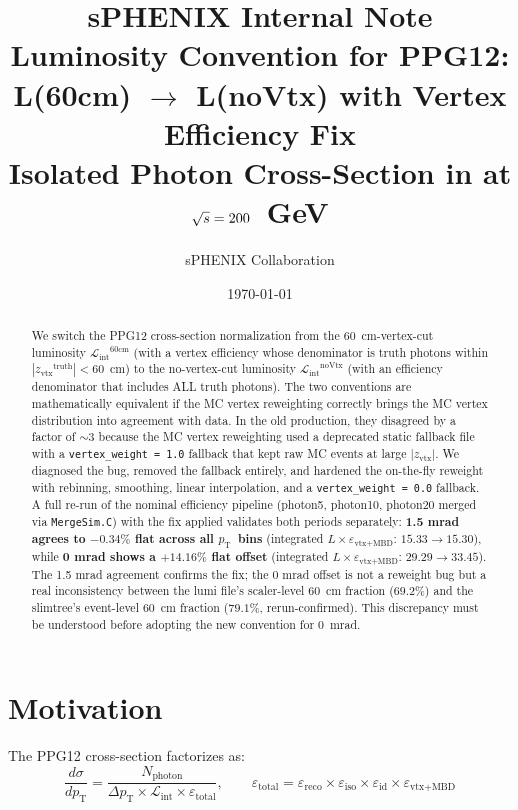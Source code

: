 \documentclass[11pt,letterpaper]{article}
\title{%
  \vspace{-1cm}
  {\large \textbf{sPHENIX Internal Note}}\\[0.5cm]
  {\LARGE \textbf{Luminosity Convention for PPG12:\\
  L(60cm) $\rightarrow$ L(noVtx) with Vertex Efficiency Fix}}\\[0.3cm]
  {\large Isolated Photon Cross-Section in \pp{} at $\mbox{$\sqrt{s}$} = 200$~GeV}
}
\author{sPHENIX Collaboration}
\date{\today}
\newcommand{\pT}{\ensuremath{p_{\text{T}}}}
\newcommand{\zvtx}{\ensuremath{z_{\mathrm{vtx}}}}
\newcommand{\Lint}{\ensuremath{\mathcal{L}_{\text{int}}}}
\newcommand{\veff}{\ensuremath{\varepsilon_{\text{vtx+MBD}}}}
\begin{document}
\maketitle

\begin{abstract}
We switch the PPG12 cross-section normalization from the
60~cm-vertex-cut luminosity $\Lint^{60\text{cm}}$ (with a vertex
efficiency whose denominator is truth photons within
$|\zvtx^{\text{truth}}|<60$~cm) to the no-vertex-cut luminosity
$\Lint^{\text{noVtx}}$ (with an efficiency denominator that includes
ALL truth photons). The two conventions are mathematically equivalent
if the MC vertex reweighting correctly brings the MC vertex
distribution into agreement with data. In the old production, they
disagreed by a factor of $\sim 3$ because the MC vertex reweighting
used a deprecated static fallback file with a
\texttt{vertex\_weight = 1.0} fallback that kept raw MC events at
large $|\zvtx|$. We diagnosed the bug, removed the fallback entirely,
and hardened the on-the-fly reweight with rebinning, smoothing,
linear interpolation, and a \texttt{vertex\_weight = 0.0} fallback.
A full re-run of the nominal efficiency pipeline (photon5, photon10,
photon20 merged via \texttt{MergeSim.C}) with the fix applied
validates both periods separately: \textbf{1.5 mrad agrees to
$-0.34\%$ flat across all \pT\ bins} (integrated $L\times\veff$:
$15.33 \rightarrow 15.30$), while \textbf{0 mrad shows a $+14.16\%$
flat offset} (integrated $L\times\veff$: $29.29 \rightarrow 33.45$).
The 1.5 mrad agreement confirms the fix; the 0 mrad offset is not a
reweight bug but a real inconsistency between the lumi file's
scaler-level 60~cm fraction ($69.2\%$) and the slimtree's event-level
60~cm fraction ($79.1\%$, rerun-confirmed). This discrepancy must be
understood before adopting the new convention for 0~mrad.
\end{abstract}

\tableofcontents
\newpage

\section{Motivation}
\label{sec:motivation}

The PPG12 cross-section factorizes as:
\begin{equation}
  \frac{d\sigma}{d\pT} = \frac{N_{\text{photon}}}{\Delta\pT \times \Lint \times \varepsilon_{\text{total}}},
  \qquad
  \varepsilon_{\text{total}} = \varepsilon_{\text{reco}} \times
  \varepsilon_{\text{iso}} \times \varepsilon_{\text{id}} \times \veff
\end{equation}
\end{document}
